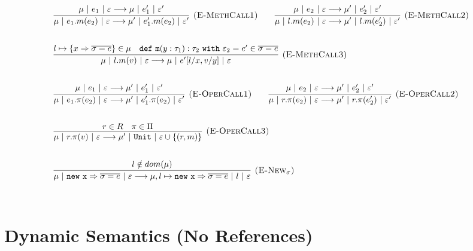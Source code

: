 \documentclass{llncs}
\newcommand{\keywadj}[1]{\mathtt{#1}}
\newcommand{\keyw}[1]{\keywadj{#1}~}
\begin{document}

\[
\begin{array}{lll}
\begin{array}{lllr}
	\infer[\textsc{(E-MethCall1)}]
		{\mu~|~e_1.m(e_2)~|~\varepsilon \longrightarrow \mu'~|~e_1'.m(e_2)~|~\varepsilon'}
		{\mu~|~e_1~|~\varepsilon \longrightarrow \mu~|~e_1'~|~\varepsilon'}
		
		~~~~~~
		
	\infer[\textsc{(E-MethCall2)}]
		{\mu~|~l.m(e_2)~|~\varepsilon \longrightarrow \mu'~|~l.m(e_2')~|~\varepsilon'}
		{\mu~|~e_2~|~\varepsilon \longrightarrow \mu'~|~e_2'~|~\varepsilon'}\\[5ex]
		
	\infer[\textsc{(E-MethCall3)}]
		{\mu~|~l.m(v)~|~\varepsilon
			\longrightarrow
		  \mu~|~e'[l/x, v/y]~|~\varepsilon}
  		{l \mapsto \{ x \Rightarrow \overline{\sigma = e} \} \in \mu & \keywadj{def~m}(y: \tau_1) : \tau_2~\keyw{with} \varepsilon_2 = e' \in \overline {\sigma = e}} \\[5ex]

	\infer[\textsc{(E-OperCall1)}]
		{\mu~|~e_1.\pi(e_2)~|~\varepsilon
			\longrightarrow
		 \mu'~|~e_1'.\pi(e_2)~|~\varepsilon'}
		{\mu~|~e_1~|~\varepsilon \longrightarrow \mu'~|~e_1'~|~\varepsilon'}
~~~~~~
			\infer[\textsc{(E-OperCall2)}]
		{\mu~|~r.\pi(e_2)~|~\varepsilon
			\longrightarrow
		 \mu'~|~r.\pi(e_2')~|~\varepsilon'}
		{\mu~|~e_2~|~\varepsilon \longrightarrow \mu'~|~e_2'~|~\varepsilon'} \\[5ex]
			
			\infer[\textsc{(E-OperCall3)}]
		{\mu~|~r.\pi(v)~|~\varepsilon
			\longrightarrow
		 \mu'~|~\keywadj{Unit}~|~\varepsilon \cup \{(r,m)\}   }
		{r \in R & \pi \in \Pi} \\[5ex]
			
	\infer[\textsc{(E-New$_\sigma$)}]
		{\mu~|~\keywadj{new~x} \Rightarrow \overline{\sigma = e}~|~\varepsilon
			\longrightarrow
		 \mu, l \mapsto \keywadj{new~x} \Rightarrow \overline{\sigma = e}~|~l~|~\varepsilon}
		{l \notin dom(\mu)} \\[5ex]
		
\end{array}
\end{array}
\]


\newpage

\section{Dynamic Semantics (No References)}
\end{document}
